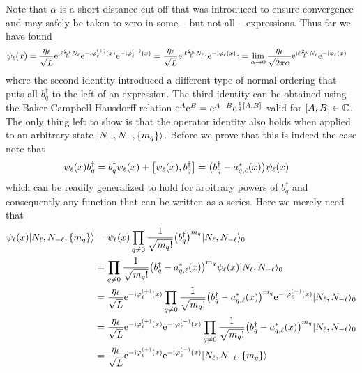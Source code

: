 \documentclass[english, parskip=full]{scrartcl}
\begin{document}
Note that $\alpha$ is a short-distance cut-off that was introduced to ensure convergence and may safely be taken to zero in some -- but not all -- expressions.
Thus far we have found
\begin{align}
\psi_\ell(x) &= \frac{\eta_\ell}{\sqrt{L}} \powe{\i\ell \frac{2\pi}{L}N_\ell} \powe{-\i\varphi_\ell^{(+)}(x)} \powe{-\i\varphi_\ell^{(-)}(x)} = \frac{\eta_\ell}{\sqrt{L}} \powe{\i\ell \frac{2\pi}{L}N_\ell} \normord{\powe{-\i\varphi_\ell(x)}} = \lim_{\alpha\rightarrow 0} \frac{\eta_\ell}{\sqrt{2\pi\alpha}} \powe{\i\ell \frac{2\pi}{L}N_\ell} \powe{-\i\varphi_\ell(x)}
\end{align}
where the second identity introduced a different type of normal-ordering that puts all $b_q^\dagger$ to the left of an expression.
The third identity can be obtained using the Baker-Campbell-Hausdorff relation $\powe{A}\powe{B} = \powe{A+B}\powe{\frac{1}{2}\klb*{A,B}}$ valid for $\klb*{A,B}\in\mathbb{C}$.
\\
The only thing left to show is that the operator identity also holds when applied to an arbitrary state $\Ket{N_+,N_-,\klc*{m_q}}$.
Before we prove that this is indeed the case note that
\begin{align}
\psi_\ell(x) b_q^\dagger &= b_q^\dagger \psi_\ell(x) + \klb*{\psi_\ell(x), b_q^\dagger} = \kla*{b_q^\dagger - a_{q,\ell}^\ast(x)}\psi_\ell(x)
\end{align}
which can be readily generalized to hold for arbitrary powers of $b_q^\dagger$ and consequently any function that can be written as a series.
Here we merely need that
\begin{align}
\psi_\ell(x) \Ket{N_\ell,N_{-\ell},\klc*{m_q}} &= \psi_\ell(x) \prod_{q\neq 0} \frac{1}{\sqrt{m_q!}} \kla*{b_q^\dagger}^{m_q} \Ket{N_\ell,N_{-\ell}}_0 \\
&= \prod_{q\neq 0} \frac{1}{\sqrt{m_q!}} \kla*{b_q^\dagger - a_{q,\ell}^\ast(x)}^{m_q} \psi_\ell(x) \Ket{N_\ell,N_{-\ell}}_0\\
&= \frac{\eta_\ell}{\sqrt{L}} \powe{-\i\varphi_\ell^{(+)}(x)} \prod_{q\neq 0} \frac{1}{\sqrt{m_q!}} \kla*{b_q^\dagger - a_{q,\ell}^\ast(x)}^{m_q} \powe{-\i\varphi_\ell^{(-)}(x)} \Ket{N_\ell,N_{-\ell}}_0\\
&=  \frac{\eta_\ell}{\sqrt{L}} \powe{-\i\varphi_\ell^{(+)}(x)} \powe{-\i\varphi_\ell^{(-)}(x)} \prod_{q\neq 0} \frac{1}{\sqrt{m_q!}} \kla*{b_q^\dagger - a_{q,\ell}^\ast(x)}^{m_q} \Ket{N_\ell,N_{-\ell}}_0 \\
&= \frac{\eta_\ell}{\sqrt{L}} \powe{-\i\varphi_\ell^{(+)}(x)} \powe{-\i\varphi_\ell^{(-)}(x)} \Ket{N_\ell,N_{-\ell},\klc*{m_q}}
\end{align}
\end{document}
